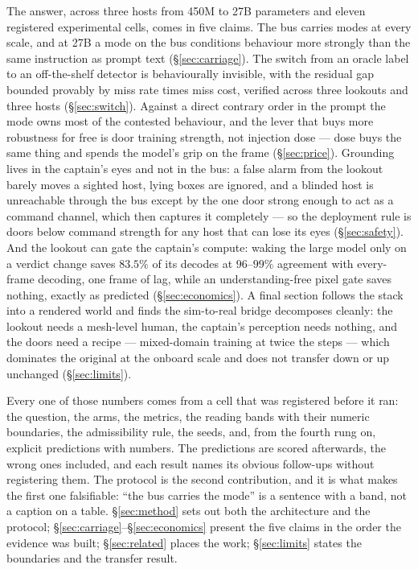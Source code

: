 \documentclass[11pt]{article}
\begin{document}
The answer, across three hosts from 450M to 27B parameters and eleven
registered experimental cells, comes in five claims. The bus carries
modes at every scale, and at 27B a mode on the bus conditions behaviour
more strongly than the same instruction as prompt text
(\S\ref{sec:carriage}). The switch from an oracle label to an
off-the-shelf detector is behaviourally invisible, with the residual
gap bounded provably by miss rate times miss cost, verified across three
lookouts and three hosts (\S\ref{sec:switch}). Against a direct
contrary order in the prompt the mode owns most of the contested
behaviour, and the lever that buys more robustness for free is door
training strength, not injection dose --- dose buys the same thing and
spends the model's grip on the frame (\S\ref{sec:price}). Grounding
lives in the captain's eyes and not in the bus: a false alarm from the
lookout barely moves a sighted host, lying boxes are ignored, and a
blinded host is unreachable through the bus except by the one door
strong enough to act as a command channel, which then captures it
completely --- so the deployment rule is doors below command strength
for any host that can lose its eyes (\S\ref{sec:safety}). And the
lookout can gate the captain's compute: waking the large model only on
a verdict change saves $83.5\%$ of its decodes at $96$--$99\%$
agreement with every-frame decoding, one frame of lag, while an
understanding-free pixel gate saves nothing, exactly as predicted
(\S\ref{sec:economics}). A final section follows the stack into a
rendered world and finds the sim-to-real bridge decomposes cleanly: the
lookout needs a mesh-level human, the captain's perception needs
nothing, and the doors need a recipe --- mixed-domain training at twice
the steps --- which dominates the original at the onboard scale and
does not transfer down or up unchanged (\S\ref{sec:limits}).

Every one of those numbers comes from a cell that was registered before
it ran: the question, the arms, the metrics, the reading bands with
their numeric boundaries, the admissibility rule, the seeds, and, from
the fourth rung on, explicit predictions with numbers. The predictions
are scored afterwards, the wrong ones included, and each result names
its obvious follow-ups without registering them. The protocol is the
second contribution, and it is what makes the first one falsifiable:
``the bus carries the mode'' is a sentence with a band, not a caption
on a table. \S\ref{sec:method} sets out both the architecture and the
protocol; \S\ref{sec:carriage}--\S\ref{sec:economics} present the five
claims in the order the evidence was built; \S\ref{sec:related} places
the work; \S\ref{sec:limits} states the boundaries and the transfer
result.
\end{document}
